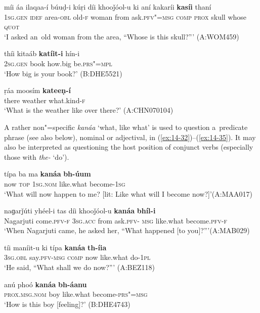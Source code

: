 \begin{exe}
\ex
\label{ex:14-29}
\gll míi áa ilaqaa-í búuḍ-i kúṛi díi khooǰóol-u  ki aní kakaríi \textbf{kasíi} thaní \\
\textsc{1sg.gen} \textsc{idef} area-\textsc{obl} old-\textsc{f} woman from ask.\textsc{pfv"=msg} \textsc{comp} \textsc{prox} skull whose \textsc{quot} \\
\glt `I asked an~old woman from the area, ``Whose is this skull?''' (A:WOM459)

\ex
\label{ex:14-30}
\gll thíi kitaáb \textbf{katíit-i} hín-i \\
\textsc{2sg.gen} book how.big be.\textsc{prs"=mpl} \\
\glt `How big is your book?' (B:DHE5521)

\ex
\label{ex:14-31}
\gll ṛáa moosím \textbf{kateeṇ-í} \\
there weather what.kind-\textsc{f} \\
\glt `What is the weather like over there?' (A:CHN070104)
\end{exe}

A rather non"=specific \textit{kanáa} `what, like what' is used to question a~predicate phrase (see also below), nominal or adjectival, in (\ref{ex:14-32})--(\ref{ex:14-35}). It may also be interpreted as questioning the host position of conjunct verbs (especially those with \textit{the-} `do'). 

\begin{exe}
\ex
\label{ex:14-32}
\gll típa ba ma \textbf{kanáa} \textbf{bh-úum} \\
now \textsc{top} \textsc{1sg.nom} like.what become-\textsc{1sg} \\
\glt `What will now happen to me? [lit: Like what will I become now?]'\newline (A:MAA017)

\ex
\label{ex:14-33}
\gll naɡarǰúti yhéel-i tas díi khooǰóol-u \textbf{kanáa} \textbf{bhíl-i}\\
Nagarjuti come.\textsc{pfv-f} \textsc{3sg.acc} from ask.\textsc{pfv- msg} like.what become.\textsc{pfv-f}\\
\glt `When Nagarjuti came, he asked her, ``What happened [to you]?'''\newline (A:MAB029)

\ex
\label{ex:14-34}
\gll tíi maníit-u ki típa \textbf{kanáa} \textbf{th-íia} \\
\textsc{3sg.obl} say.\textsc{pfv-msg} \textsc{comp} now like.what do-\textsc{1pl} \\
\glt `He said, ``What shall we do now?''' (A:BEZ118)

\ex
\label{ex:14-35}
\gll anú phoó \textbf{kanáa} \textbf{bh-áanu} \\
\textsc{prox.msg.nom} boy like.what become-\textsc{prs"=msg} \\
\glt `How is this boy [feeling]?' (B:DHE4743)
\end{exe}

